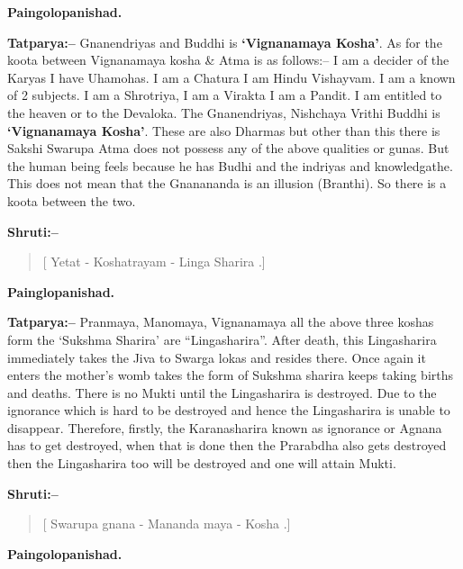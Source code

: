 \begin{flushright}
\textbf{Paingolopanishad.}
\end{flushright}

\textbf{Tatparya:–} Gnanendriyas and Buddhi is \textbf{‘Vignanamaya Kosha’}. As for the koota between Vignanamaya kosha \& Atma is as follows:– I am a decider of the Karyas I have Uhamohas. I am a Chatura I am Hindu Vishayvam. I am a known of 2 subjects. I am a Shrotriya, I am a Virakta I am a Pandit. I am entitled to the heaven or to the Devaloka. The Gnanendriyas, Nishchaya Vrithi Buddhi is \textbf{‘Vignanamaya Kosha’}. These are also Dharmas but other than this there is Sakshi Swarupa Atma does not possess any of the above qualities or gunas. But the human being feels because he has Budhi and the indriyas and knowledgathe. This does not mean that the Gnanananda is an illusion (Branthi). So there is a koota between the two.

\newpage

\textbf{Shruti:–}

\begin{verse}
[ Yetat - Koshatrayam - Linga Sharira .]
\end{verse}

\begin{flushright}
\textbf{Painglopanishad.}
\end{flushright}

\textbf{Tatparya:–} Pranmaya, Manomaya, Vignanamaya all the above three koshas form the ‘Sukshma Sharira’ are “Lingasharira”. After death, this Lingasharira immediately takes the Jiva to Swarga lokas and resides there. Once again it enters the mother's womb takes the form of Sukshma sharira keeps taking births and deaths. There is no Mukti until the Lingasharira is destroyed. Due to the ignorance which is hard to be destroyed and hence the Lingasharira is unable to disappear. Therefore, firstly, the Karanasharira known as ignorance or Agnana has to get destroyed, when that is done then the Prarabdha also gets destroyed then the Lingasharira too will be destroyed and one will attain Mukti.

\textbf{Shruti:–}

\begin{verse}
[ Swarupa gnana - Mananda maya - Kosha .]
\end{verse}

\begin{flushright}
\textbf{Paingolopanishad.}
\end{flushright}

